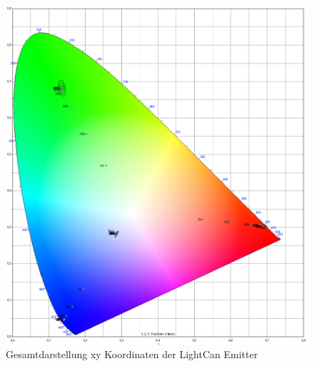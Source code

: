 \documentclass[11pt]{scrartcl}
\begin{document}
\begin{figure}[H]
    \begin{center}
        \includegraphics[width=\textwidth]{images/macAdam/lightCanTotal.png}
    \end{center}
    \caption{Gesamtdarstellung xy Koordinaten der LightCan Emitter}
\end{figure}
\end{document}
